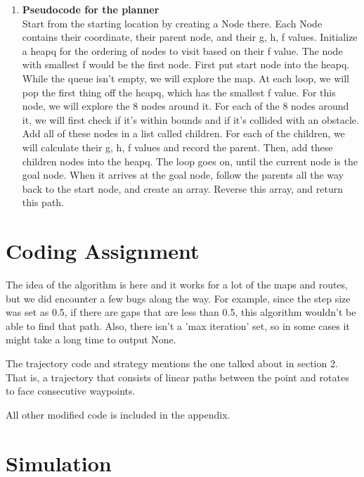 \documentclass{article}
\begin{document}
\begin{enumerate}
    \item \textbf{Pseudocode for the planner} \\ 
    Start from the starting location by creating a Node there. Each Node contains their coordinate, their parent node, and their g, h, f values. Initialize a heapq for the ordering of nodes to visit based on their f value. The node with smallest f would be the first node. First put start node into the heapq. While the queue isn't empty, we will explore the map. At each loop, we will pop the first thing off the heapq, which has the smallest f value. For this node, we will explore the 8 nodes around it. For each of the 8 nodes around it, we will first check if it's within bounds and if it's collided with an obstacle. Add all of these nodes in a list called children. For each of the children, we will calculate their g, h, f values and record the parent. Then, add these children nodes into the heapq. The loop goes on, until the current node is the goal node. When it arrives at the goal node, follow the parents all the way back to the start node, and create an array. Reverse this array, and return this path.
 
         
\end{enumerate}         
\newpage

\section{Coding Assignment}



The idea of the algorithm is here and it works for a lot of the maps and routes, but we did encounter a few bugs along the way. For example, since the step size was set as 0.5, if there are gaps that are less than 0.5, this algorithm wouldn't be able to find that path. Also, there isn't a 'max iteration' set, so in some cases it might take a long time to output None.
\newpage


The trajectory code and strategy mentions the one talked about in section 2. That is, a trajectory that consists of linear paths between the point and rotates to face consecutive waypoints.

All other modified code is included in the appendix. \\ 

\newpage

\section{Simulation}
\end{document}
